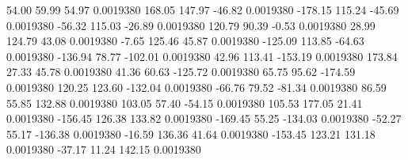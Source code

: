    54.00   59.99   54.97   0.0019380
  168.05  147.97  -46.82   0.0019380
 -178.15  115.24  -45.69   0.0019380
  -56.32  115.03  -26.89   0.0019380
  120.79   90.39   -0.53   0.0019380
   28.99  124.79   43.08   0.0019380
   -7.65  125.46   45.87   0.0019380
 -125.09  113.85  -64.63   0.0019380
 -136.94   78.77 -102.01   0.0019380
   42.96  113.41 -153.19   0.0019380
  173.84   27.33   45.78   0.0019380
   41.36   60.63 -125.72   0.0019380
   65.75   95.62 -174.59   0.0019380
  120.25  123.60 -132.04   0.0019380
  -66.76   79.52  -81.34   0.0019380
   86.59   55.85  132.88   0.0019380
  103.05   57.40  -54.15   0.0019380
  105.53  177.05   21.41   0.0019380
 -156.45  126.38  133.82   0.0019380
 -169.45   55.25 -134.03   0.0019380
  -52.27   55.17 -136.38   0.0019380
  -16.59  136.36   41.64   0.0019380
 -153.45  123.21  131.18   0.0019380
  -37.17   11.24  142.15   0.0019380
